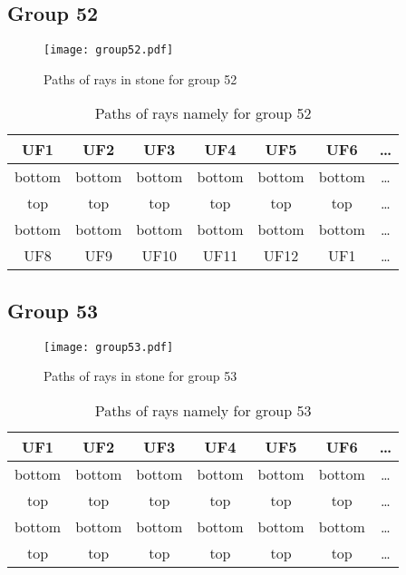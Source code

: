 \subsection*{Group 52}






\begin{figure}[h!]
\centering
\texttt{[image: group52.pdf]}
\caption{Paths of rays in stone for group 52}
\label{table:FigGroup52}
\end{figure}



\begin{table}[h!]
\centering
\begin{tabular}{|c|c|c|c|c|c|c|}
\hline
UF1 & UF2 & UF3 & UF4 & UF5 & UF6 & \dots \\
\hline
bottom & bottom & bottom & bottom & bottom & bottom & \dots \\
\hline
top & top & top & top & top & top & \dots \\
\hline
bottom & bottom & bottom & bottom & bottom & bottom & \dots \\
\hline
UF8 & UF9 & UF10 & UF11 & UF12 & UF1 & \dots \\
\hline
\end{tabular}
\caption{Paths of rays namely for group 52}
\label{table:TableGroup52}
\end{table}
\newpage
\subsection*{Group 53}






\begin{figure}[h!]
\centering
\texttt{[image: group53.pdf]}
\caption{Paths of rays in stone for group 53}
\label{table:FigGroup53}
\end{figure}



\begin{table}[h!]
\centering
\begin{tabular}{|c|c|c|c|c|c|c|}
\hline
UF1 & UF2 & UF3 & UF4 & UF5 & UF6 & \dots \\
\hline
bottom & bottom & bottom & bottom & bottom & bottom & \dots \\
\hline
top & top & top & top & top & top & \dots \\
\hline
bottom & bottom & bottom & bottom & bottom & bottom & \dots \\
\hline
top & top & top & top & top & top & \dots \\
\hline
\end{tabular}
\caption{Paths of rays namely for group 53}
\label{table:TableGroup53}
\end{table}
\newpage
